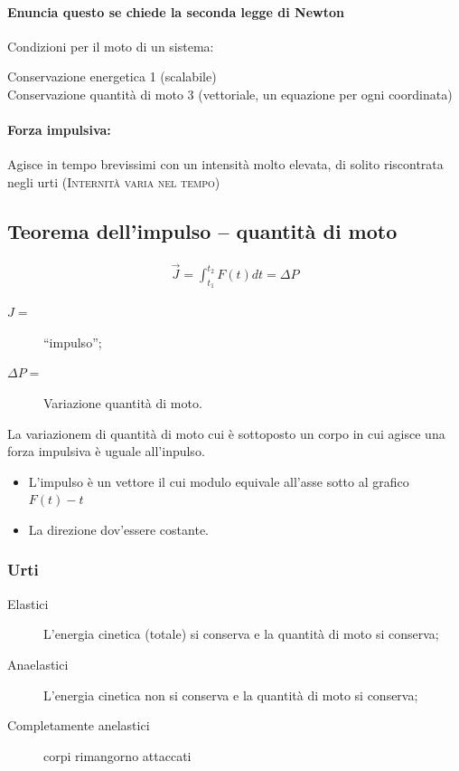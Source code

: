 \documentclass{book}
\begin{document}
\paragraph{Enuncia questo se chiede la seconda legge di Newton}
Condizioni per il moto di un sistema:
\begin{center}
  Conservazione energetica \textrightarrow{} 1 (scalabile)\\
  Conservazione quantità di moto \textrightarrow{} 3 (vettoriale, un equazione per ogni coordinata)
\end{center}

\paragraph{Forza impulsiva:}

Agisce in tempo brevissimi con un intensità molto elevata, di solito riscontrata negli urti (\textsc{Internità varia nel tempo})

\subsection{Teorema dell'impulso -- quantità di moto}
\label{sec:teodelimpquantmoto}
\begin{eqnarray}
  \label{eq:teoremadelimp}
  \vec{J}=\int_{t_1}^{t_2}F(t) dt=\Delta P
\end{eqnarray}
\begin{description}
\item[$J=$] ``impulso'';
\item[$\Delta P=$] Variazione quantità di moto.
\end{description}
La variazionem di quantità di moto cui è sottoposto un corpo in cui agisce una forza impulsiva è uguale all'inpulso.
\begin{itemize}
\item L'impulso è un vettore il cui modulo equivale all'asse sotto al grafico $F(t)-t$
\item La direzione dov'essere costante.
\end{itemize}

\subsubsection{Urti}
\label{sec:urti}
\begin{description}
\item[Elastici] L'energia cinetica (totale) si conserva e la quantità di moto si conserva;
\item[Anaelastici] L'energia cinetica non si conserva e la quantità di moto si conserva;
\item[Completamente anelastici] corpi rimangorno attaccati
\end{description}
\end{document}
